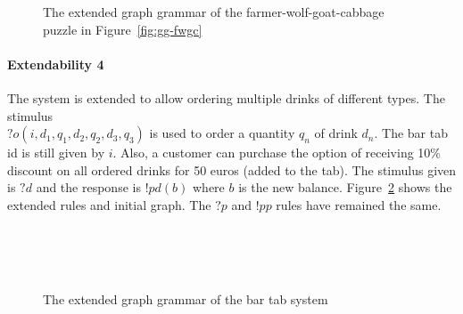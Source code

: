 \begin{figure}[ht]
  \begin{center}
    \hspace{20px}
  \end{center}
  \caption{The extended graph grammar of the farmer-wolf-goat-cabbage puzzle in Figure~\ref{fig:gg-fwgc}}
  \label{fig:gg-fwgc-extended}
\end{figure}

\paragraph*{Extendability 4}
The system is extended to allow ordering multiple drinks of different types. The stimulus \\$?o(i,d_1,q_1,d_2,q_2,d_3,q_3)$ is used to order a quantity $q_n$ of drink $d_n$. The bar tab id is still given by $i$. Also, a customer can purchase the option of receiving 10\% discount on all ordered drinks for 50 euros (added to the tab). The stimulus given is $?\mathit{d}$ and the response is $!pd(b)$ where $b$ is the new balance. Figure~\ref{fig:gg-bartab-extended} shows the extended rules and initial graph. The $?p$ and $!pp$ rules have remained the same.

\begin{figure}[ht]
  \begin{center}
    \hspace{20px}
    \\
    \hspace{20px}
    \\
    \\
  \end{center}
  \caption{The extended graph grammar of the bar tab system}
  \label{fig:gg-bartab-extended}
\end{figure}

